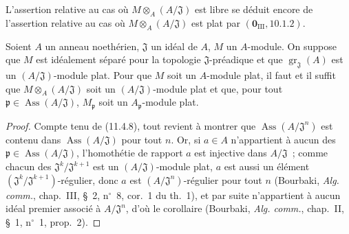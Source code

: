 
L'assertion relative au cas où $M\otimes_A(A/\mathfrak J)$ est libre se déduit
encore de l'assertion relative au cas où $M\otimes_A(A/\mathfrak J)$ est plat
par $(\mathbf 0_{\mathrm{III}},10.1.2)$.

\begin{corollary}[11.4.10]
\label{IV.11.4.10-fr}
Soient $A$ un anneau noethérien, $\mathfrak J$ un idéal de $A$, $M$ un
$A$-module. On suppose que $M$ est idéalement séparé pour la topologie
$\mathfrak J$-préadique et que $\operatorname{gr}_{\mathfrak J}(A)$ est un
$(A/\mathfrak J)$-module plat. Pour que $M$ soit un $A$-module plat, il faut et
il suffit que $M\otimes_A(A/\mathfrak J)$ soit un $(A/\mathfrak J)$-module plat
et que, pour tout $\mathfrak p\in\operatorname{Ass}(A/\mathfrak J)$,
$M_{\mathfrak p}$ soit un $A_{\mathfrak p}$-module plat.
\end{corollary}

\begin{proof}
Compte tenu de (11.4.8), tout revient à montrer que
$\operatorname{Ass}(A/\mathfrak J^n)$ est contenu dans
$\operatorname{Ass}(A/\mathfrak J)$ pour tout $n$. Or, si $a\in A$ n'appartient
à aucun des $\mathfrak p\in\operatorname{Ass}(A/\mathfrak J)$, l'homothétie de
rapport $a$ est injective dans $A/\mathfrak J$~; comme chacun des
$\mathfrak J^k/\mathfrak J^{k+1}$ est un $(A/\mathfrak J)$-module plat, $a$ est
aussi un élément $(\mathfrak J^k/\mathfrak J^{k+1})$-régulier, donc $a$ est
$(A/\mathfrak J^n)$-régulier pour tout $n$ (Bourbaki, \emph{Alg. comm.},
chap.~III, \S~2, n$^\circ$~8, cor.~1 du th.~1), et par suite n'appartient à
aucun idéal premier associé à $A/\mathfrak J^n$, d'où le corollaire (Bourbaki,
\emph{Alg. comm.}, chap.~II, \S~1, n$^\circ$~1, prop.~2).
\end{proof}

